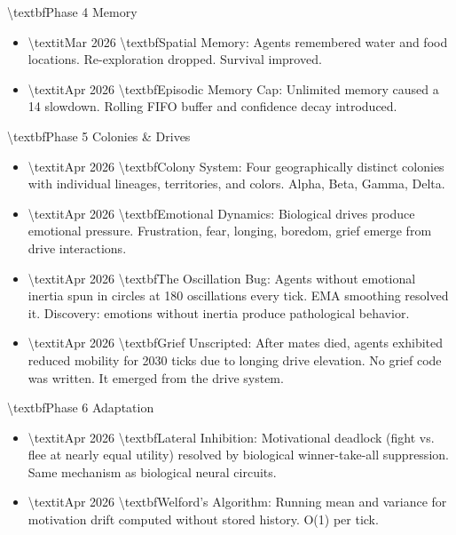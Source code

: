 \documentclass[11pt,a4paper]{article}
\begin{document}
\textbackslash{}textbf{Phase 4  Memory}
\begin{itemize}
  \item \textbackslash{}textit{Mar 2026}  \textbackslash{}textbf{Spatial Memory}: Agents remembered water and food locations. Re-exploration dropped. Survival improved.
  \item \textbackslash{}textit{Apr 2026}  \textbackslash{}textbf{Episodic Memory Cap}: Unlimited memory caused a 14 slowdown. Rolling FIFO buffer and confidence decay introduced.
\end{itemize}

\textbackslash{}textbf{Phase 5  Colonies \& Drives}
\begin{itemize}
  \item \textbackslash{}textit{Apr 2026}  \textbackslash{}textbf{Colony System}: Four geographically distinct colonies with individual lineages, territories, and colors. Alpha, Beta, Gamma, Delta.
  \item \textbackslash{}textit{Apr 2026}  \textbackslash{}textbf{Emotional Dynamics}: Biological drives produce emotional pressure. Frustration, fear, longing, boredom, grief emerge from drive interactions.
  \item \textbackslash{}textit{Apr 2026}  \textbackslash{}textbf{The Oscillation Bug}: Agents without emotional inertia spun in circles at 180 oscillations every tick. EMA smoothing resolved it. Discovery: emotions without inertia produce pathological behavior.
  \item \textbackslash{}textit{Apr 2026}  \textbackslash{}textbf{Grief  Unscripted}: After mates died, agents exhibited reduced mobility for 2030 ticks due to longing drive elevation. No grief code was written. It emerged from the drive system.
\end{itemize}

\textbackslash{}textbf{Phase 6  Adaptation}
\begin{itemize}
  \item \textbackslash{}textit{Apr 2026}  \textbackslash{}textbf{Lateral Inhibition}: Motivational deadlock (fight vs. flee at nearly equal utility) resolved by biological winner-take-all suppression. Same mechanism as biological neural circuits.
  \item \textbackslash{}textit{Apr 2026}  \textbackslash{}textbf{Welford's Algorithm}: Running mean and variance for motivation drift computed without stored history. O(1) per tick.
\end{itemize}
\end{document}
